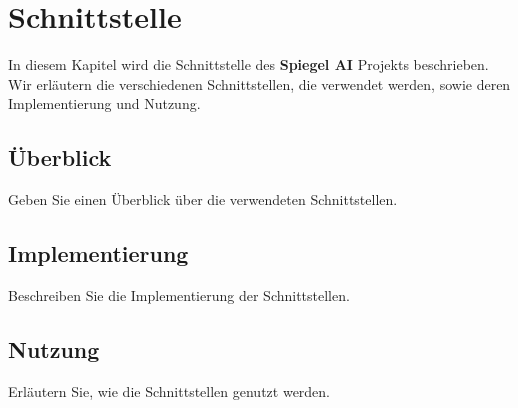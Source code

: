 \chapter{Schnittstelle}

In diesem Kapitel wird die Schnittstelle des \textbf{Spiegel AI} Projekts beschrieben. Wir erläutern die verschiedenen Schnittstellen, die verwendet werden, sowie deren Implementierung und Nutzung.

\section{Überblick}
Geben Sie einen Überblick über die verwendeten Schnittstellen.

\section{Implementierung}
Beschreiben Sie die Implementierung der Schnittstellen.

\section{Nutzung}
Erläutern Sie, wie die Schnittstellen genutzt werden.

